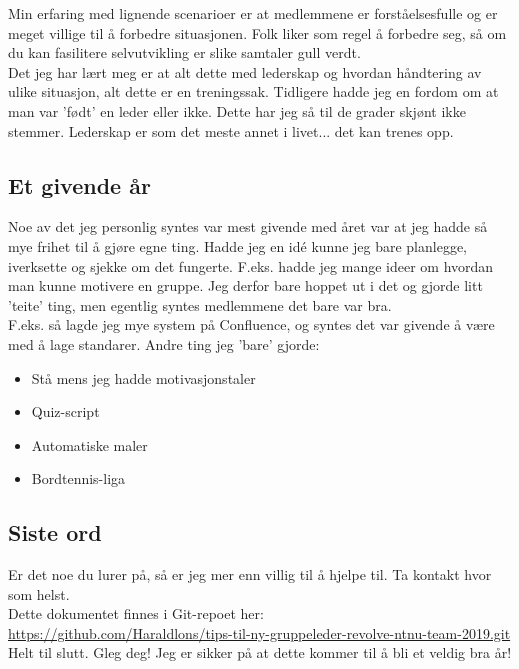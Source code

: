 Min erfaring med lignende scenarioer er at medlemmene er forståelsesfulle og er meget villige til å forbedre situasjonen. Folk liker som regel å forbedre seg, så om du kan fasilitere selvutvikling er slike samtaler gull verdt. \\

Det jeg har lært meg er at alt dette med lederskap og hvordan håndtering av ulike situasjon, alt dette er en treningssak. Tidligere hadde jeg en fordom om at man var 'født' en leder eller ikke. Dette har jeg så til de grader skjønt ikke stemmer. Lederskap er som det meste annet i livet... det kan trenes opp. 

\subsection{Et givende år}
Noe av det jeg personlig syntes var mest givende med året var at jeg hadde så mye frihet til å gjøre egne ting. Hadde jeg en idé kunne jeg bare planlegge, iverksette og sjekke om det fungerte. F.eks. hadde jeg mange ideer om hvordan man kunne motivere en gruppe. Jeg derfor bare hoppet ut i det og gjorde litt 'teite' ting, men egentlig syntes medlemmene det bare var bra. \\
	F.eks. så lagde jeg mye system på Confluence, og syntes det var givende å være med å lage standarer.
	Andre ting jeg 'bare' gjorde:
\begin{itemize}
	\item Stå mens jeg hadde motivasjonstaler
	\item Quiz-script
	\item Automatiske maler
	\item Bordtennis-liga
\end{itemize}

\subsection*{Siste ord}
Er det noe du lurer på, så er jeg mer enn villig til å hjelpe til. Ta kontakt hvor som helst. \\
Dette dokumentet finnes i Git-repoet her: \\ \url{https://github.com/Haraldlons/tips-til-ny-gruppeleder-revolve-ntnu-team-2019.git}\\

Helt til slutt. Gleg deg! Jeg er sikker på at dette kommer til å bli et veldig bra år!


% 
% 


